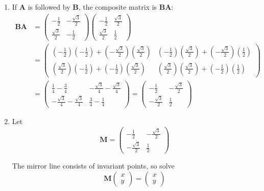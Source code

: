 \documentclass[leqno]{article}
\begin{document}
\begin{enumerate}[
  label=\textbf{\arabic*.},
  leftmargin=*,
  topsep=0pt,
  partopsep=0pt,
  parsep=0pt
]
\begin{djsSolution}
\begin{enumerate}[label=\textbf{(\roman*)}]
\item
If \(\mathbf{A}\) is followed by \(\mathbf{B}\), the composite matrix is \(\mathbf{B}\mathbf{A}\):
\begin{align*}
\mathbf{B}\mathbf{A}&=
\begin{pmatrix}
-\frac12 & -\frac{\sqrt3}{2}\\[4pt]
\frac{\sqrt3}{2} & -\frac12
\end{pmatrix}
\begin{pmatrix}
-\frac12 & \frac{\sqrt3}{2}\\[4pt]
\frac{\sqrt3}{2} & \frac12
\end{pmatrix}\\
&=
\begin{pmatrix}
\left(-\frac12\right)\left(-\frac12\right)+\left(-\frac{\sqrt3}{2}\right)\left(\frac{\sqrt3}{2}\right)
&
\left(-\frac12\right)\left(\frac{\sqrt3}{2}\right)+\left(-\frac{\sqrt3}{2}\right)\left(\frac12\right)
\\[8pt]
\left(\frac{\sqrt3}{2}\right)\left(-\frac12\right)+\left(-\frac12\right)\left(\frac{\sqrt3}{2}\right)
&
\left(\frac{\sqrt3}{2}\right)\left(\frac{\sqrt3}{2}\right)+\left(-\frac12\right)\left(\frac12\right)
\end{pmatrix}\\
&=
\begin{pmatrix}
\frac14-\frac34 & -\frac{\sqrt3}{4}-\frac{\sqrt3}{4}\\[4pt]
-\frac{\sqrt3}{4}-\frac{\sqrt3}{4} & \frac34-\frac14
\end{pmatrix}
=
\begin{pmatrix}
-\frac12 & -\frac{\sqrt3}{2}\\[4pt]
-\frac{\sqrt3}{2} & \frac12
\end{pmatrix}
\end{align*}

\item
Let
\[
\mathbf{M}=
\begin{pmatrix}
-\frac12 & -\frac{\sqrt3}{2}\\[4pt]
-\frac{\sqrt3}{2} & \frac12
\end{pmatrix}
\]

The mirror line consists of invariant points, so solve
\[
\mathbf{M}\begin{pmatrix}x\\y\end{pmatrix}
=
\begin{pmatrix}x\\y\end{pmatrix}
\]


\end{enumerate}
\end{djsSolution}
\end{enumerate}
\end{document}
